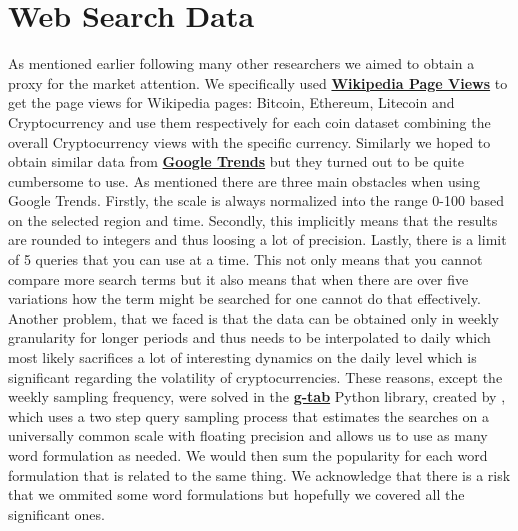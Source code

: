 \section{Web Search Data}

As mentioned earlier following many other researchers we aimed to 
obtain a proxy for the market
attention. We specifically used \textbf{\href{https://pageviews.wmcloud.org/}{Wikipedia Page Views}}
to get the page views for Wikipedia pages: Bitcoin, Ethereum, Litecoin and 
Cryptocurrency and use them respectively for each coin dataset combining 
the overall Cryptocurrency views with the specific currency. Similarly we 
hoped to obtain similar data from 
\textbf{\href{https://trends.google.com/trends/}{Google Trends}} but they
turned out to be quite cumbersome to use. As \cite{West2020a} mentioned 
there are three main obstacles when using Google Trends. Firstly, the scale
is always normalized into the range 0-100 based on the selected region and time.
Secondly, this implicitly means that the results are rounded to integers and thus 
loosing a lot of precision. Lastly, there is a limit of 5 queries that you can 
use at a time. This not only means that you cannot compare more search terms 
but it also means that when there are over five variations how the term might
be searched for one cannot do that effectively. Another problem, 
that we faced is that the data can be obtained only in weekly granularity
for longer periods and thus needs to be interpolated to daily which 
most likely sacrifices a lot of interesting dynamics on the daily level which
is significant regarding the volatility of cryptocurrencies. 
These reasons, except the weekly sampling frequency, were solved in 
the \textbf{\href{https://github.com/epfl-dlab/GoogleTrendsAnchorBank}{g-tab}}
Python library, created by \cite{West2020a}, which uses a 
two step query sampling process that 
estimates the searches on a universally common scale with floating precision and allows 
us to use as many word formulation as needed. We would then sum the popularity
for each word formulation that is related to the same thing. We acknowledge
that there is a risk that we ommited some word formulations but hopefully
we covered all the significant ones.


